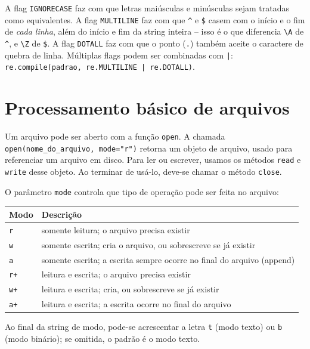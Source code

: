 \documentclass[11pt,a4paper]{article}
\begin{document}
A flag \texttt{IGNORECASE} faz com que letras maiúsculas e minúsculas
sejam tratadas como equivalentes. A flag \texttt{MULTILINE} faz com que
\texttt{\^{}} e \texttt{\$} casem com o início e o fim de \emph{cada
linha}, além do início e fim da string inteira -- isso é o que diferencia
\texttt{\textbackslash A} de \texttt{\^{}}, e \texttt{\textbackslash Z} de
\texttt{\$}. A flag \texttt{DOTALL} faz com que o ponto (\texttt{.})
também aceite o caractere de quebra de linha. Múltiplas flags podem ser
combinadas com \texttt{|}: \texttt{re.compile(padrao, re.MULTILINE |
re.DOTALL)}.

\section{Processamento básico de arquivos}

Um arquivo pode ser aberto com a função \texttt{open}. A chamada
\texttt{open(nome\_do\_arquivo, mode="r")} retorna um objeto de arquivo,
usado para referenciar um arquivo em disco. Para ler ou escrever, usamos
os métodos \texttt{read} e \texttt{write} desse objeto. Ao terminar de
usá-lo, deve-se chamar o método \texttt{close}.

O parâmetro \texttt{mode} controla que tipo de operação pode ser feita no
arquivo:

\begin{center}
\begin{tabularx}{\textwidth}{lX}
\toprule
\textbf{Modo} & \textbf{Descrição} \\
\midrule
\texttt{r} & somente leitura; o arquivo precisa existir \\
\texttt{w} & somente escrita; cria o arquivo, ou sobrescreve se já existir \\
\texttt{a} & somente escrita; a escrita sempre ocorre no final do arquivo (append) \\
\texttt{r+} & leitura e escrita; o arquivo precisa existir \\
\texttt{w+} & leitura e escrita; cria, ou sobrescreve se já existir \\
\texttt{a+} & leitura e escrita; a escrita ocorre no final do arquivo \\
\bottomrule
\end{tabularx}
\end{center}

Ao final da string de modo, pode-se acrescentar a letra \texttt{t} (modo
texto) ou \texttt{b} (modo binário); se omitida, o padrão é o modo texto.
\end{document}

